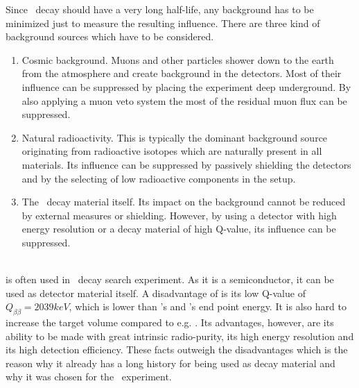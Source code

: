\documentclass[encoding=utf8,british]{tumphthesis}
\begin{document}
Since \onbb\ decay should have a very long half-life, any background has to be minimized just to measure the resulting influence.
There are three kind of background sources which have to be considered.
\begin{enumerate}
    \item Cosmic background.
Muons and other particles shower down to the earth from the atmosphere and create background in the detectors.
Most of their influence can be suppressed by placing the experiment deep underground.
By also applying a muon veto system the most of the residual muon flux can be suppressed.
\item Natural radioactivity.
This is typically the dominant background source originating from radioactive isotopes which are naturally present in all materials.
Its influence can be suppressed by passively shielding the detectors and by the selecting of low radioactive components in the setup. 
\item The \twonu\ decay material itself.
Its impact on the background cannot be reduced by external measures or shielding.
However, by using a detector with high energy resolution or a decay material of high Q-value, its influence can be suppressed.
\end{enumerate}
\\

 is often used in \onbb\ decay search experiment. 
As it is a semiconductor, it can be used as detector material itself.
A disadvantage of  is its low Q-value of $Q_{\beta\beta} = 2039\unit{keV}$, which is lower than 's and 's end point energy.
It is also hard to increase the target volume compared to e.g. .
Its advantages, however, are its ability to be made with great intrinsic radio-purity, its high energy resolution and its high detection efficiency.
These facts outweigh the disadvantages which is the reason why it already has a long history for being used as decay material and why it was chosen for the \gerda\ experiment.
\\

\end{document}
